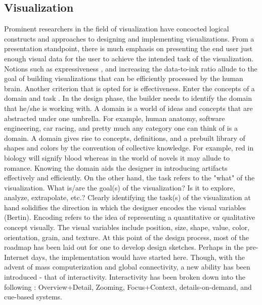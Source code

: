 \documentclass[12pt]{article}
\begin{document}
\subsection{Visualization}
Prominent researchers in the field of visualization have concocted logical constructs and approaches to designing and implementing visualizations. From a presentation standpoint, there is much emphasis on presenting the end user just enough visual data for the user to achieve the intended task of the visualization. Notions such as expressiveness \cite{schumann}, and increasing the data-to-ink ratio \cite{tufte} allude to the goal of building visualizations that can be efficiently processed by the human brain. Another criterion that is opted for is effectiveness. Enter the concepts of a domain and task \cite{munzner}. In the design phase, the builder needs to identify the domain that he/she is working with. A domain is a world of ideas and concepts that are abstracted under one umbrella. For example, human anatomy, software engineering, car racing, and pretty much any category one can think of is a domain. A domain gives rise to concepts, definitions, and a prebuilt library of shapes and colors by the convention of collective knowledge. For example, red in biology will signify blood whereas in the world of novels it may allude to romance. Knowing the domain aids the designer in introducing artifacts effectively and efficiently. On the other hand, the task refers to the "what" of the visualization. What is/are the goal(s) of the visualization? Is it to explore, analyze, extrapolate, etc.? Clearly identifying the task(s) of the visualization at hand solidifies the direction in which the designer encodes the visual variables (Bertin). Encoding refers to the idea of representing a quantitative or qualitative concept visually. The visual variables include position, size, shape, value, color, orientation, grain, and texture. At this point of the design process, most of the roadmap has been laid out for one to develop design sketches. Perhaps in the pre-Internet days, the implementation would have started here. Though, with the advent of mass computerization and global connectivity, a new ability has been introduced - that of interactivity. Interactivity has been broken down into the following \cite{cockburn}: Overview+Detail, Zooming, Focus+Context, details-on-demand, and cue-based systems.
\end{document}
